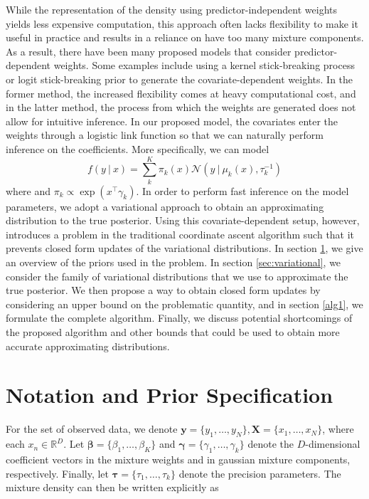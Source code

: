 \documentclass[twoside,11pt]{article}
\newcommand\given[1][]{\:#1\vert\:}
\newcommand{\transpose}[1]{#1^{\intercal}}
\newcommand{\R}{\mathbb{R}}
\newcommand{\boldbeta}{\boldsymbol\beta}
\newcommand{\boldgamma}{\boldsymbol\gamma}
\newcommand{\boldtau}{\boldsymbol\tau}
\begin{document}
While the representation of the density using predictor-independent weights yields less expensive computation, this approach often lacks flexibility to make it useful in practice and results in a reliance on have too many mixture components. As a result, there have been many proposed models that consider predictor-dependent weights. Some examples include using a kernel stick-breaking process \parencite{dunsonpark:08} or logit stick-breaking prior \parencite{durante:17} to generate the covariate-dependent weights. In the former method, the increased flexibility comes at heavy computational cost, and in the latter method, the process from which the weights are generated does not allow for intuitive inference. In our proposed model, the covariates enter the weights through a logistic link function so that we can naturally perform inference on the coefficients. More specifically, we can model
\begin{equation} \label{eq:covdep_gm}
	 f(y \given x) = \sum_{k}^{K} \pi_k(x) \mathcal{N} \left( y \given \mu_k(x), \tau_k^{-1} \right) 
\end{equation} 
where and $\pi_{k} \propto \exp(\transpose{x} \gamma_k)$. In order to perform fast inference on the model parameters, we adopt a variational approach to obtain an approximating distribution to the true posterior. Using this covariate-dependent setup, however, introduces a problem in the traditional coordinate ascent algorithm such that it prevents closed form updates of the variational distributions. In section \ref{sec:priors}, we give an overview of the priors used in the problem. In section \ref{sec:variational}, we consider the family of variational distributions that we use to approximate the true posterior. We then propose a way to obtain closed form updates by considering an upper bound on the problematic quantity, and in section \ref{alg1}, we formulate the complete algorithm. Finally, we discuss potential shortcomings of the proposed algorithm and other bounds that could be used to obtain more accurate approximating distributions.

\section{Notation and Prior Specification} \label{sec:priors}
For the set of observed data, we denote $\mathbf{y} = \{y_1, \ldots, y_N \}, \mathbf{X} = \{ x_1, \ldots, x_N \}$, where each $x_n \in \R^{D}$. Let $\boldbeta = \{ \beta_1, \ldots, \beta_K\}$ and $\boldgamma = \{ \gamma_1, \ldots, \gamma_k\}$ denote the $D$-dimensional coefficient vectors  in the mixture weights and in gaussian mixture components, respectively. Finally, let $\boldtau = \{ \tau_1, \ldots, \tau_k \}$ denote the precision parameters. The mixture density can then be written explicitly as
\end{document}

